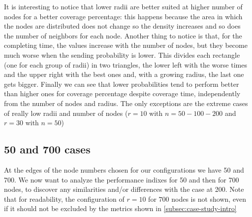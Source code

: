It is interesting to notice that lower radii are better suited at higher number of nodes for a better coverage percentage: this happens because the area in which the nodes are distributed does not change so the density increases and so does the number of neighbors for each node. 
Another thing to notice is that, for the completing time, the values increase with the number of nodes, but they become much worse when the sending probability is lower. This divides each rectangle (one for each group of radii) in two triangles, the lower left with the worse times and the upper right with the best ones and, with a growing radius, the last one gets bigger.
Finally we can see that lower probabilities tend to perform better than higher ones for coverage percentage despite coverage time, independently from the number of nodes and radius. The only exceptions are the extreme cases of really low radii and number of nodes ($r=10$ with $n=50-100-200$ and $r=30$ with $n=50$)


\subsection{50 and 700 cases}

At the edges of the node numbers chosen for our configurations we have 50 and 700. We now want to analyze the performance indixes for 50 and then for 700 nodes, to discover any similarities and/or differences with the case at 200. Note that for readability, the configuration of $r=10$ for $700$ nodes is not shown, even if it should not be excluded by the metrics shown in \ref{subsec:case-study-intro}

